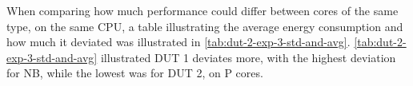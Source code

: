 When comparing how much performance could differ between cores of the same type, on the same CPU, a table illustrating the average energy consumption and how much it deviated was illustrated in \cref{tab:dut-2-exp-3-std-and-avg}. \cref{tab:dut-2-exp-3-std-and-avg} illustrated DUT 1 deviates more, with the highest deviation for NB, while the lowest was for DUT 2, on P cores.










